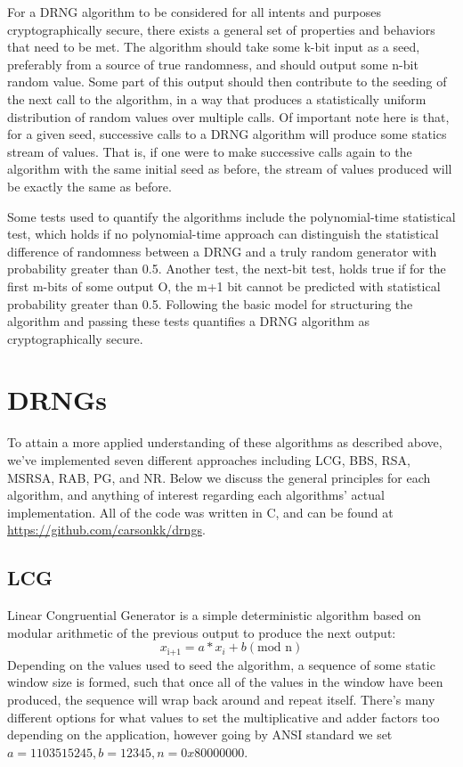 \documentclass[12pt,letter,notitlepage]{article}
\begin{document}
For a DRNG algorithm to be considered for all intents and purposes cryptographically secure, there exists a general set of properties and behaviors that need to be met. The algorithm should take some k-bit input as a seed, preferably from a source of true randomness, and should output some n-bit random value. Some part of this output should then contribute to the seeding of the next call to the algorithm, in a way that produces a statistically uniform distribution of random values over multiple calls. Of important note here is that, for a given seed, successive calls to a DRNG algorithm will produce some statics stream of values. That is, if one were to make successive calls again to the algorithm with the same initial seed as before, the stream of values produced will be exactly the same as before. 

Some tests used to quantify the algorithms include the polynomial-time statistical test, which holds if no polynomial-time approach can distinguish the statistical difference of randomness between a DRNG and a truly random generator with probability greater than 0.5. Another test, the next-bit test, holds true if for the first m-bits of some output O, the m+1 bit cannot be predicted with statistical probability greater than 0.5. Following the basic model for structuring the algorithm and passing these tests quantifies a DRNG algorithm as cryptographically secure.

\section{DRNGs}

To attain a more applied understanding of these algorithms as described above, we've implemented seven different approaches including LCG, BBS, RSA, MSRSA, RAB, PG, and NR. Below we discuss the general principles for each algorithm, and anything of interest regarding each algorithms' actual implementation. All of the code was written in C, and can be found at \url{https://github.com/carsonkk/drngs}.

\subsection{LCG}

Linear Congruential Generator is a simple deterministic algorithm based on modular arithmetic of the previous output to produce the next output: 
\[x_{\text{i+1}} = a * x_i + b ({\text{mod n}})\]
Depending on the values used to seed the algorithm, a sequence of some static window size is formed, such that once all of the values in the window have been produced, the sequence will wrap back around and repeat itself. There's many different options for what values to set the multiplicative and adder factors too depending on the application, however going by ANSI standard we set $a = 1103515245, b = 12345, n = 0x80000000$.
\end{document}
